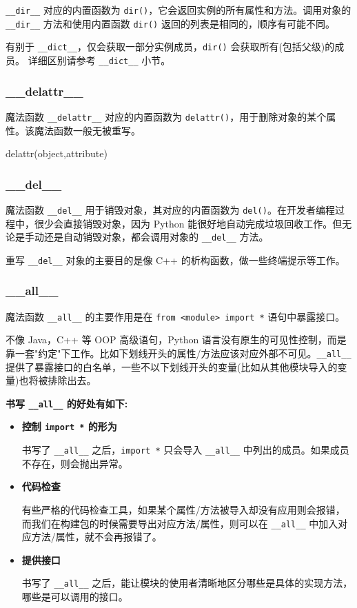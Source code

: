 \texttt{\_\_dir\_\_} 对应的内置函数为 \texttt{dir()}，它会返回实例的所有属性和方法。调用对象的 \texttt{\_\_dir\_\_} 方法和使用内置函数 \texttt{dir()} 返回的列表是相同的，顺序有可能不同。

有别于 \texttt{\_\_dict\_\_}，仅会获取一部分实例成员，\texttt{dir()} 会获取所有(包括父级)的成员。 详细区别请参考 \texttt{\_\_dict\_\_} 小节。 

\subsubsection{\_\_delattr\_\_}

魔法函数 \texttt{\_\_delattr\_\_} 对应的内置函数为 \texttt{delattr()}，用于删除对象的某个属性。该魔法函数一般无被重写。
\begin{python}
delattr(object,attribute)
\end{python}

\subsubsection{\_\_del\_\_}

魔法函数 \texttt{\_\_del\_\_} 用于销毁对象，其对应的内置函数为 \texttt{del()}。在开发者编程过程中，很少会直接销毁对象，因为 Python 能很好地自动完成垃圾回收工作。但无论是手动还是自动销毁对象，都会调用对象的 \texttt{\_\_del\_\_} 方法。

重写 \texttt{\_\_del\_\_} 对象的主要目的是像 C++ 的析构函数，做一些终端提示等工作。

\subsubsection{\_\_all\_\_}

魔法函数 \texttt{\_\_all\_\_} 的主要作用是在 \texttt{from <module> import *} 语句中暴露接口。

不像 Java，C++ 等 OOP 高级语句，Python 语言没有原生的可见性控制，而是靠一套"约定"下工作。比如下划线开头的属性/方法应该对应外部不可见。\texttt{\_\_all\_\_} 提供了暴露接口的白名单，一些不以下划线开头的变量(比如从其他模块导入的变量)也将被排除出去。

\noindent\textbf{书写 \texttt{\_\_all\_\_} 的好处有如下:}
\begin{itemize}
    \item \textbf{控制 \texttt{import *} 的形为}
    
    书写了 \texttt{\_\_all\_\_} 之后，\texttt{import *} 只会导入 \texttt{\_\_all\_\_} 中列出的成员。如果成员不存在，则会抛出异常。

    \item \textbf{代码检查}
    
    有些严格的代码检查工具，如果某个属性/方法被导入却没有应用则会报错，而我们在构建包的时候需要导出对应方法/属性，则可以在 \texttt{\_\_all\_\_} 中加入对应方法/属性，就不会再报错了。

    \item \textbf{提供接口}
    
    书写了 \texttt{\_\_all\_\_} 之后，能让模块的使用者清晰地区分哪些是具体的实现方法，哪些是可以调用的接口。
\end{itemize}

